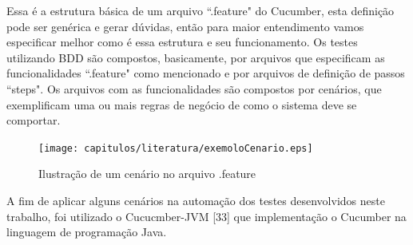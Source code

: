 Essa é a estrutura básica de um arquivo ``.feature" do Cucumber, esta definição pode ser genérica e gerar dúvidas, então para maior entendimento vamos especificar melhor como é essa estrutura e seu funcionamento. Os testes utilizando BDD são compostos, basicamente, por arquivos que especificam as funcionalidades ``.feature" como mencionado e por arquivos de definição de passos ``steps". Os arquivos com as funcionalidades são compostos por cenários, que exemplificam uma ou mais regras de negócio de como o sistema deve se comportar.

\begin{figure}[H]
	\centering
	\captionsetup{justification=centering,margin=2cm}
	\texttt{[image: capitulos/literatura/exemoloCenario.eps]}
	\caption{Ilustração de um cenário no arquivo .feature}
	\label{fig:iceCreamConAntiPattern}
\end{figure}	

A fim de aplicar alguns cenários na automação dos testes desenvolvidos neste trabalho, foi utilizado o Cucucmber-JVM [33] que implementação o Cucumber na linguagem de programação Java.
